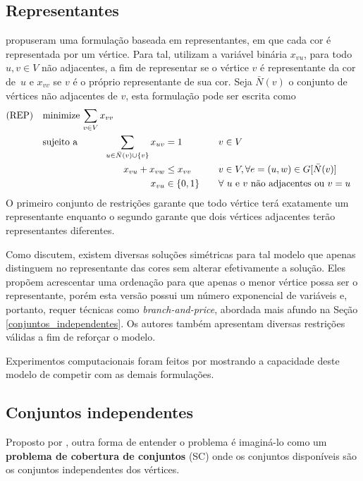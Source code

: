 \documentclass[11pt]{article}
\begin{document}
\subsection{Representantes}
\label{sec:orga936655}
\textcite{Campelo2004CliquesHolesVertex} propuseram uma formulação baseada em representantes, em que cada cor é representada por um vértice.
Para tal, utilizam a variável binária \(x_{vu}\), para todo \(u, v \in V\) não adjacentes, a fim de representar se o vértice \(v\) é representante da cor de~\(u\) e \(x_{vv}\) se \(v\) é o próprio representante de sua cor.
Seja \(\bar{N}(v)\) o conjunto de vértices não adjacentes de \(v\), esta formulação pode ser escrita como
\begin{alignat*}{4}
\mathrm{(REP)} \quad & \omit\rlap{minimize  $\displaystyle \sum_{v \in V} x_{vv}$} \\
& \mbox{sujeito a}&& \quad & \sum_{u \in \bar{N}(v) \cup \{v\}} x_{uv}&= 1        & \quad & v \in V \\
&                 &&   & x_{vu} + x_{vw}    & \leq x_{vv} &   & v \in V, \forall e = (u,w) \in G[\bar{N}(v)] \\
&                 &&   & x_{vu}       & \in \{0,1\} &   & \forall \text{ $u$ e $v$ não adjacentes ou $v = u$}
\end{alignat*}
O primeiro conjunto de restrições garante que todo vértice terá exatamente um representante enquanto o segundo garante que dois vértices adjacentes terão representantes diferentes.

Como \textcite{Campelo2008AsymmetricRepresentativesFormulation} discutem, existem diversas soluções simétricas para tal modelo que apenas distinguem no representante das cores sem alterar efetivamente a solução.
Eles propõem acrescentar uma ordenação para que apenas o menor vértice possa ser o representante, porém esta versão possui um número exponencial de variáveis e, portanto, requer técnicas como \emph{branch-and-price}, abordada mais afundo na Seção \ref{conjuntos_independentes}.
Os autores também apresentam diversas restrições válidas a fim de reforçar o modelo.

Experimentos computacionais foram feitos por \textcite{Jabrayilov2018NewIntegerLinear} mostrando a capacidade deste modelo de competir com as demais formulações.

\subsection{Conjuntos independentes}
\label{sec:org561f43e}
\label{conjuntos_independentes}
Proposto por \textcite{Mehrotra1996ColumnGenerationApproach}, outra forma de entender o problema é imaginá-lo como um \textbf{problema de cobertura de conjuntos} (SC) onde os conjuntos disponíveis são os conjuntos independentes dos vértices.
\end{document}
